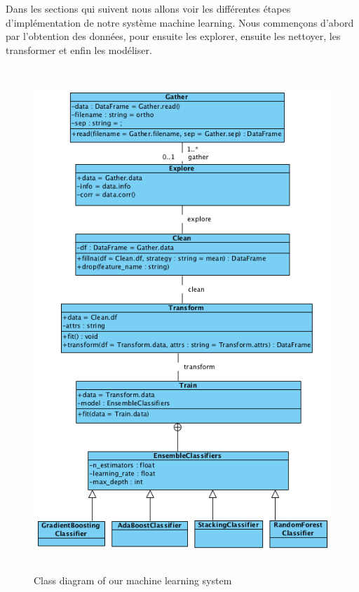 \documentclass[12pt, french]{report}
\begin{document}


Dans les sections qui suivent nous allons voir les différentes étapes d'implémentation de notre système machine learning. Nous commençons d'abord par l'obtention des données, pour ensuite les explorer, ensuite les nettoyer, les transformer et enfin les modéliser. 

\begin{figure}[p]
\includegraphics[width=13cm, height=19cm]{images/MLClassDiag.png}
\caption{Class diagram of our machine learning system}
\label{MLClassDiag}
\end{figure}
\newpage
\end{document}

